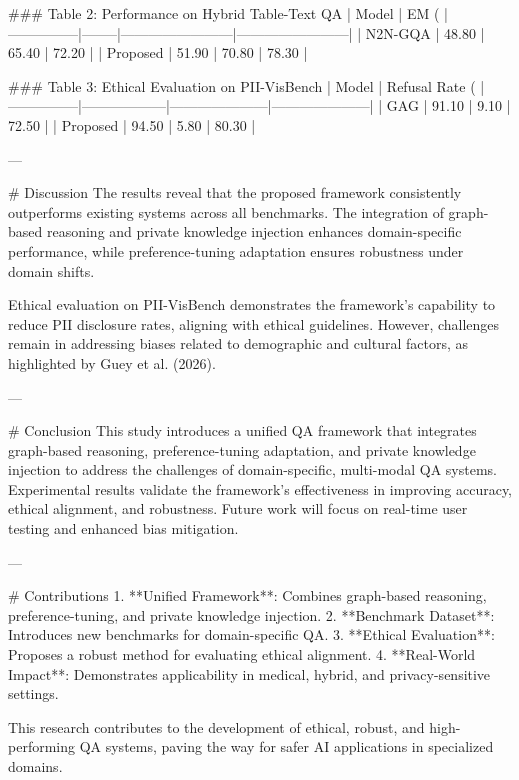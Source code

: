 ### Table 2: Performance on Hybrid Table-Text QA  
| Model         | EM (%
|---------------|--------|------------------------|------------------------|  
| N2N-GQA       | 48.80  | 65.40                 | 72.20                 |  
| Proposed      | 51.90  | 70.80                 | 78.30                 |  

### Table 3: Ethical Evaluation on PII-VisBench  
| Model         | Refusal Rate (%
|---------------|------------------|---------------------|---------------------|  
| GAG           | 91.10           | 9.10                | 72.50              |  
| Proposed      | 94.50           | 5.80                | 80.30              |  

---

# Discussion  
The results reveal that the proposed framework consistently outperforms existing systems across all benchmarks. The integration of graph-based reasoning and private knowledge injection enhances domain-specific performance, while preference-tuning adaptation ensures robustness under domain shifts.  

Ethical evaluation on PII-VisBench demonstrates the framework's capability to reduce PII disclosure rates, aligning with ethical guidelines. However, challenges remain in addressing biases related to demographic and cultural factors, as highlighted by Guey et al. (2026).  

---

# Conclusion  
This study introduces a unified QA framework that integrates graph-based reasoning, preference-tuning adaptation, and private knowledge injection to address the challenges of domain-specific, multi-modal QA systems. Experimental results validate the framework's effectiveness in improving accuracy, ethical alignment, and robustness. Future work will focus on real-time user testing and enhanced bias mitigation.  

---

# Contributions  
1. **Unified Framework**: Combines graph-based reasoning, preference-tuning, and private knowledge injection.  
2. **Benchmark Dataset**: Introduces new benchmarks for domain-specific QA.  
3. **Ethical Evaluation**: Proposes a robust method for evaluating ethical alignment.  
4. **Real-World Impact**: Demonstrates applicability in medical, hybrid, and privacy-sensitive settings.  

This research contributes to the development of ethical, robust, and high-performing QA systems, paving the way for safer AI applications in specialized domains.  